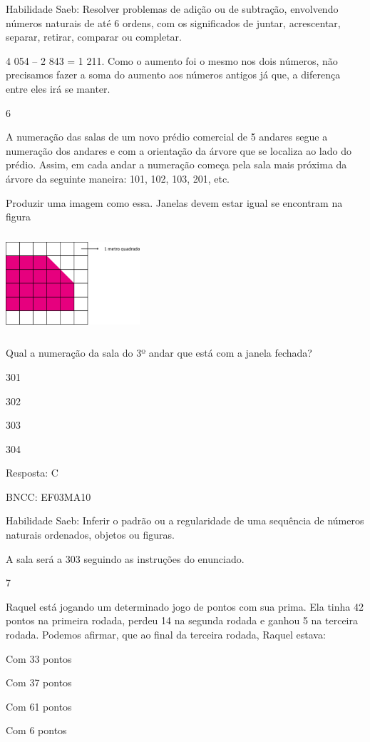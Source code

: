 \begin{escolha}
Habilidade Saeb: Resolver problemas de adição ou de subtração,
envolvendo números naturais de até 6 ordens, com os significados de
juntar, acrescentar, separar, retirar, comparar ou completar.

4 054 -- 2 843 = 1 211. Como o aumento foi o mesmo nos dois números, não
precisamos fazer a soma do aumento aos números antigos já que, a
diferença entre eles irá se manter.

\num{6}

A numeração das salas de um novo prédio comercial de 5 andares segue a
numeração dos andares e com a orientação da árvore que se localiza ao
lado do prédio. Assim, em cada andar a numeração começa pela sala mais
próxima da árvore da seguinte maneira: 101, 102, 103, 201, etc.

Produzir uma imagem como essa. Janelas devem estar igual se encontram na
figura

\includegraphics[width=1.96154in,height=1.44792in]{media/image108.png}

Qual a numeração da sala do 3º andar que está com a janela fechada?

\begin{escolha}
\item
  301
\item
  302
\item
  303
\item
  304
\end{escolha}

Resposta: C

BNCC: EF03MA10

Habilidade Saeb: Inferir o padrão ou a regularidade de uma sequência de
números naturais ordenados, objetos ou figuras.

A sala será a 303 seguindo as instruções do enunciado.

\num{7}

Raquel está jogando um determinado jogo de pontos com sua prima. Ela
tinha 42 pontos na primeira rodada, perdeu 14 na segunda rodada e ganhou
5 na terceira rodada. Podemos afirmar, que ao final da terceira rodada,
Raquel estava:

\begin{escolha}
\item
  Com 33 pontos
\item
  Com 37 pontos
\item
  Com 61 pontos
\item
  Com 6 pontos
\end{escolha}


\end{escolha}
